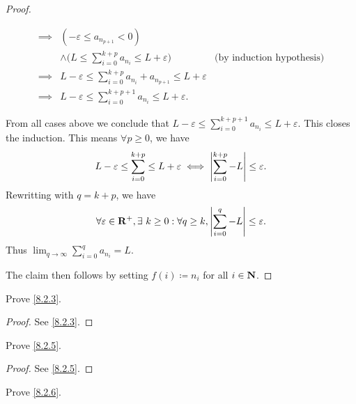 \begin{proof}
\begin{itemize}
\begin{itemize}
\begin{align*}
                    \implies & (-\varepsilon \leq a_{n_{p + 1}} < 0)                                                                                          \\
                             & \land \Bigg(L \leq \sum_{i = 0}^{k + p} a_{n_i} \leq L + \varepsilon\Bigg)                  & \text{(by induction hypothesis)} \\
                    \implies & L - \varepsilon \leq \sum_{i = 0}^{k + p} a_{n_i} + a_{n_{p + 1}} \leq L + \varepsilon                                         \\
                    \implies & L - \varepsilon \leq \sum_{i = 0}^{k + p + 1} a_{n_i} \leq L + \varepsilon.
                  \end{align*}
          \end{itemize}
          From all cases above we conclude that \(L - \varepsilon \leq \sum_{i = 0}^{k + p + 1} a_{n_i} \leq L + \varepsilon\).
          This closes the induction.
          This means \(\forall p \geq 0\), we have
          \[
            L - \varepsilon \leq \sum_{i = 0}^{k + p} \leq L + \varepsilon \iff \left\lvert\sum_{i = 0}^{k + p} - L\right\rvert \leq \varepsilon.
          \]
          Rewritting with \(q = k + p\), we have
          \[
            \forall \varepsilon \in \mathbf{R}^+, \exists\ k \geq 0 : \forall q \geq k, \left\lvert\sum_{i = 0}^q - L\right\rvert \leq \varepsilon.
          \]
          Thus \(\lim_{q \to \infty} \sum_{i = 0}^q a_{n_i} = L\).
  \end{itemize}
  The claim then follows by setting \(f(i) \coloneqq n_i\) for all \(i \in \mathbf{N}\).
\end{proof}

\exercisesection

\begin{exercise}\label{ex 8.2.1}
  Prove \cref{8.2.3}.
\end{exercise}

\begin{proof}
  See \cref{8.2.3}.
\end{proof}

\begin{exercise}\label{ex 8.2.2}
  Prove \cref{8.2.5}.
\end{exercise}

\begin{proof}
  See \cref{8.2.5}.
\end{proof}

\begin{exercise}\label{ex 8.2.3}
  Prove \cref{8.2.6}.
\end{exercise}

